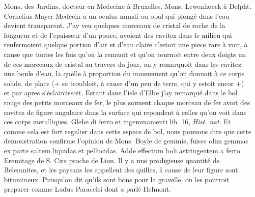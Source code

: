 \pend%
%
\pstart%
Mons. des Jardins, docteur en Medecine \`{a} Bruxelles.\protect{}
\pend%
%
\pstart%
Mons. Lewenhoeck\protect{} \`{a} Delpht.\protect{}
\pend%
%
\pstart%
Cornelius Mayer\protect{} Medecin a un oculus mundi ou opal qui plong\'{e} dans l'eau devient transparent. J'ay veu quelques morceaux de cristal de roche de la longueur et de l'epaisseur d'un pouce,  avoient des cavitez dans le milieu qui renfermoient quelque portion d'air et d'eau claire c'estoit une piece rare \`{a} voir, \`{a} cause que toutes les fois qu'on la remuoit et qu'on tournoit entre deux doigts un de ces morceaux de cristal au travers du jour, on y remarquoit dans les cavitez une boule d'eau, la quelle \`{a} proportion du mouuement qu'on donnoit \`{a} ce corps solide,  de place (+ se troubloit, \`{a} cause d'un peu de terre, qui y estoit encor +) et par apres s'\'{e}claircissoit.
\pend%
%
\pstart%
Estant dans l'isle d'Elbe\protect{} j'ay remarqu\'{e} dans le bol rouge des petits morceaux de fer,
le plus souuent chaque morceau de fer avoit des cavitez de figure angulaire dans la surface qui repondent \`{a} celles qu'on voit dans ces corps metalliques,
Glebe di ferro et
ingemmamenti lib. 16, \textit{Hist. nat.}
%
Et comme cela est fort regulier dans cette espece de bol, nous pouuons dire que cette demonstration confirme l'opinion de Mons. Boyle\protect{} de gemmis, fuisse olim gemmas ex parte saltem liquidas et pellucidas. Adde effectum boli  astringentem a ferro.
\pend%
\newpage
\pstart%
Eremitage de S. Cire\protect{} proche de Lion\protect{}. Il y a une prodigieuse quantit\'{e} de Belemnites, et les paysans les appellent des quilles, \`{a} cause de leur figure sont bitumineux. Puisqu'on dit qu'ils sont bons pour la gravelle, on les pourroit preparer comme Ludus Paracelsi\protect{} dont a parl\'{e} Helmont\protect{}.
